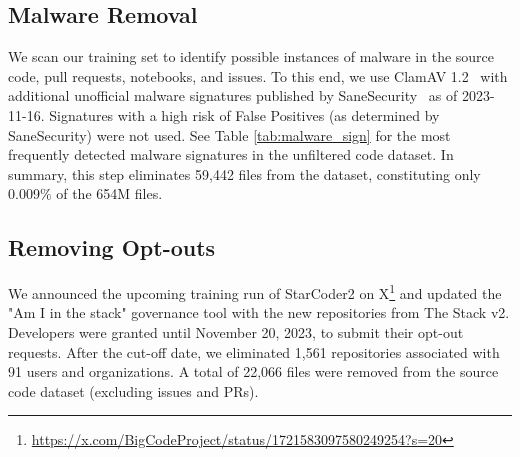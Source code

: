 \documentclass[10pt]{article} %
\begin{document}

\subsection{Malware Removal}\label{sec:malware}
We scan our training set to identify possible instances of malware in the source code, pull requests, notebooks, and issues. To this end, we use ClamAV 1.2~\citep{clamav} with additional unofficial malware signatures published by SaneSecurity~\citep{sanesecurity} as of 2023-11-16. Signatures with a high risk of False Positives (as determined by SaneSecurity) were not used. See Table \ref{tab:malware_sign} for the most frequently detected malware signatures in the unfiltered code dataset. In summary, this step eliminates 59,442 files from the dataset, constituting only 0.009\% of the 654M files. 

\subsection{Removing Opt-outs}\label{sec:optouts}
We announced the upcoming training run of StarCoder2 on X\footnote{\url{https://x.com/BigCodeProject/status/1721583097580249254?s=20}} and updated the "Am I in the stack" governance tool with the new repositories from The Stack v2. Developers were granted until November 20, 2023, to submit their opt-out requests. After the cut-off date, we eliminated 1,561 repositories associated with 91 users and organizations. A total of 22,066 files were removed from the source code dataset (excluding issues and PRs). 
\end{document}
